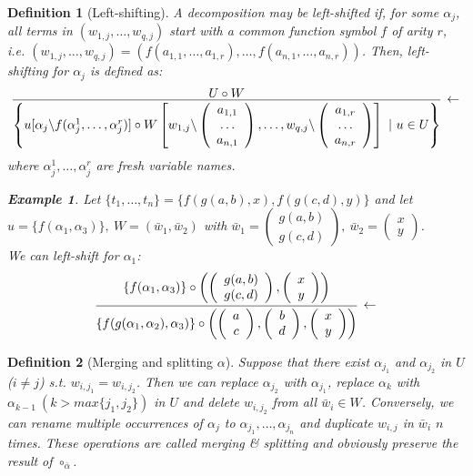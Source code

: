 \documentclass[a4paper, 11pt]{report}
\newcommand{\colvec}[1]{\left(\begin{array}{c}#1\end{array}\right)}
\newtheorem{example}{Example}
\newtheorem{definition}{Definition}
\begin{document}
\begin{definition}[Left-shifting]
  A decomposition may be left-shifted if, for some $\alpha_j$, all terms in $(w_{1,j},\dots,w_{q,j})$ start with a
  common function symbol $f$ of arity $r$, i.e. $(w_{1,j},\dots,w_{q,j}) = (f(a_{1,1},\dots,a_{1,r}),\dots,f(a_{n,1},\dots,a_{n,r}))$.
  Then, left-shifting for $\alpha_j$ is defined as:
%
  $$
  \infer[\leftarrow]{
    \left\{ u[\alpha_j\backslash f(\alpha_j^1,\dots,\alpha_j^r)] \circ W\left[w_{1,j}\backslash \colvec{a_{1,1}\\\ldots\\a_{n,1}},\ldots,w_{q,j}\backslash\colvec{a_{1,r}\\\ldots\\a_{n,r}}\right]\ |\ u \in U \right\}
  }
   { U \circ W }  
  $$
%
  \noindent
  where $\alpha_j^1,\dots,\alpha_j^r$ are fresh variable names.

  \begin{example}\label{ex.leftShiftEx}
    Let $\{t_1,\dots,t_n\} = \{f(g(a,b),x),f(g(c,d),y)\}$ and let\\
    $u = \{f(\alpha_1,\alpha_3)\},\ W=(\bar{w}_1,\bar{w}_2)$ with $\bar{w}_1 = \colvec{g(a,b)\\g(c,d)},\ \bar{w}_2 = \colvec{x\\y}$.\\
    We can left-shift for $\alpha_1$:
%
    $$
    \infer[\leftarrow]{ \{f(g(\alpha_1,\alpha_2),\alpha_3)\} \circ \left(\colvec{a\\c},\colvec{b\\d},\colvec{x\\y}\right) }
     { \{f(\alpha_1,\alpha_3)\} \circ \left(\colvec{g(a,b)\\g(c,d)},\colvec{x\\y}\right) }  
    $$
%
  \end{example}
\end{definition}

\begin{definition}[Merging and splitting $\alpha$]
  Suppose that there exist $\alpha_{j_1}$ and $\alpha_{j_2}$ in $U$ ($i \neq j$) s.t. $w_{i,j_1} = w_{i,j_2}$.
  Then we can replace $\alpha_{j_2}$ with $\alpha_{j_1}$, replace $\alpha_k$ with $\alpha_{k-1}\ (k > max\{j_1,j_2\})$ in $U$
  and delete $w_{i,j_2}$ from all $\bar{w}_i \in W$. Conversely, we can rename multiple occurrences of
  $\alpha_j$ to $\alpha_{j_1},\ldots,\alpha_{j_n}$ and duplicate $w_{i,j}$ in $\bar{w}_i$ $n$ times.
  These operations are called merging \& splitting and obviously preserve the result of $\circ_{\bar{\alpha}}$.
\end{definition}
\end{document}
